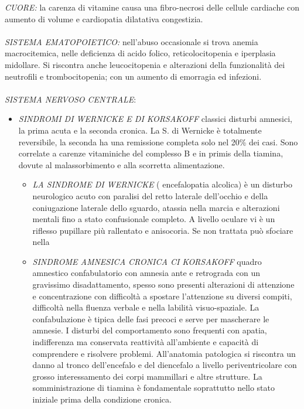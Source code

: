 \emph{CUORE:} la carenza di vitamine causa una fibro-necrosi delle
cellule cardiache con aumento di volume e cardiopatia dilatativa
congestizia.
\\\\
\emph{SISTEMA EMATOPOIETICO:} nell'abuso occasionale si trova anemia
macrocitemica, nelle deficienza di acido folico, reticolocitopenia e
iperplasia midollare. Si riscontra anche leucocitopenia e alterazioni
della funzionalità dei neutrofili e trombocitopenia; con un aumento di
emorragia ed infezioni.
\\\\
\emph{SISTEMA NERVOSO CENTRALE}:
\begin{itemize}
\item
\emph{SINDROMI DI WERNICKE E DI KORSAKOFF} classici disturbi amnesici,
la prima acuta e la seconda cronica. La S. di Wernicke è totalmente
reversibile, la seconda ha una remissione completa solo nel 20\% dei
casi. Sono correlate a carenze vitaminiche del complesso B e in primis
della tiamina, dovute al malassorbimento e alla scorretta alimentazione.

\begin{itemize}
\item
\emph{LA SINDROME DI WERNICKE} ( encefalopatia alcolica) è un disturbo
neurologico acuto con paralisi del retto laterale dell'occhio e della
coniugazione laterale dello sguardo, atassia nella marcia e alterazioni
mentali fino a stato confusionale completo. A livello oculare vi è un
riflesso pupillare più rallentato e anisocoria. Se non trattata può
sfociare nella
\item
\emph{SINDROME AMNESICA CRONICA CI KORSAKOFF} quadro amnestico
confabulatorio con amnesia ante e retrograda con un gravissimo
disadattamento, spesso sono presenti alterazioni di attenzione e
concentrazione con difficoltà a spostare l'attenzione su diversi
compiti, difficoltà nella fluenza verbale e nella labilità
visuo-spaziale. La confabulazione è tipica delle fasi precoci e serve
per mascherare le amnesie. I disturbi del comportamento sono frequenti
con apatia, indifferenza ma conservata reattività all'ambiente e
capacità di comprendere e risolvere problemi. All'anatomia patologica si
riscontra un danno al tronco dell'encefalo e del diencefalo a livello
periventricolare con grosso interessamento dei corpi mammillari e altre
strutture. La somministrazione di tiamina è fondamentale soprattutto
nello stato iniziale prima della condizione cronica.
\end{itemize}


\end{itemize}
